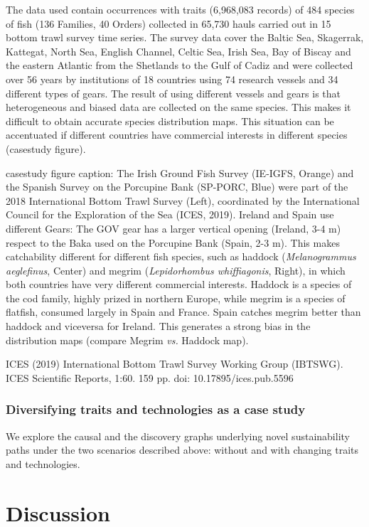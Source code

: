 \documentclass[12pt,a4paper]{article}
\begin{document}
The data used contain occurrences with traits (6,968,083 records) of 484 species of fish (136 Families, 40 Orders) collected in 65,730 hauls carried out in 15 bottom trawl survey time series. The survey data cover the Baltic Sea, Skagerrak, Kattegat, North Sea, English Channel, Celtic Sea, Irish Sea, Bay of Biscay and the eastern Atlantic from the Shetlands to the Gulf of Cadiz and were collected over 56 years by institutions of 18 countries using 74 research vessels and 34 different types of gears. The result of using different vessels and gears is that heterogeneous and biased data are collected on the same species. This makes it difficult to obtain accurate species distribution maps. This situation can be accentuated if different countries have commercial interests in different species (casestudy figure).

casestudy figure caption: The Irish Ground Fish Survey (IE-IGFS, Orange) and the Spanish Survey on the Porcupine Bank (SP-PORC, Blue) were part of the 2018 International Bottom Trawl Survey (Left), coordinated by the International Council for the Exploration of the Sea (ICES, 2019). Ireland and Spain use different Gears: The GOV gear has a larger vertical opening (Ireland, 3-4 m) respect to the Baka used on the Porcupine Bank (Spain, 2-3 m). This makes catchability different for different fish species, such as haddock (\textit{Melanogrammus aeglefinus}, Center) and megrim (\textit{Lepidorhombus whiffiagonis}, Right), in which both countries have very different commercial interests. Haddock is a species of the cod family, highly prized in northern Europe, while megrim is a species of flatfish, consumed largely in Spain and France. Spain catches megrim better than haddock and viceversa for Ireland. This generates a strong bias in the distribution maps (compare Megrim \textit{vs.} Haddock map).

ICES (2019) International Bottom Trawl Survey Working Group (IBTSWG). ICES Scientific Reports, 1:60. 159 pp. doi: 10.17895/ices.pub.5596

\subsubsection{Diversifying traits and technologies as a case study}
We explore the causal and the discovery graphs underlying novel sustainability paths under the two scenarios described above: without and with changing traits and technologies.

\section{Discussion}
\end{document}
